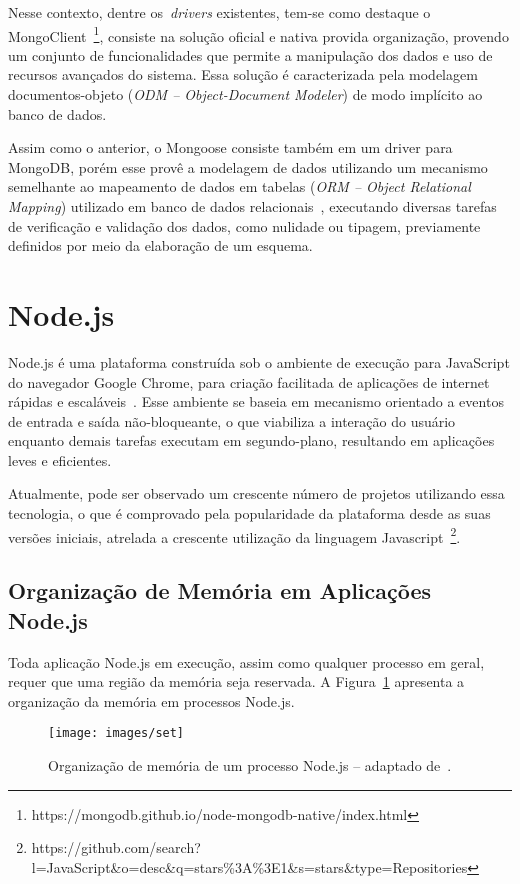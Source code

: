 \documentclass[12pt]{article}
\begin{document}
Nesse contexto, dentre os~\emph{drivers} existentes, tem-se como destaque o MongoClient~\footnote{https://mongodb.github.io/node-mongodb-native/index.html}, consiste na solução oficial e nativa provida organização, provendo um conjunto de funcionalidades que permite a manipulação dos dados e uso de recursos avançados do sistema. 
Essa solução é caracterizada pela modelagem documentos-objeto (\emph{ODM -- Object-Document Modeler}) de modo implícito ao banco de dados.

Assim como o anterior, o Mongoose consiste também em um driver para MongoDB, porém esse provê a modelagem de dados utilizando um mecanismo semelhante ao mapeamento de dados em tabelas (\emph{ORM -- Object Relational Mapping}) utilizado em banco de dados relacionais~\cite{mardan2014boosting}, executando diversas tarefas de verificação e validação dos dados, como nulidade ou tipagem, previamente definidos por meio da elaboração de um esquema.

\section{Node.js}
\label{section:nodejs}

Node.js é uma plataforma construída sob o ambiente de execução para JavaScript do navegador Google Chrome, para criação facilitada de aplicações de internet rápidas e escaláveis~\cite{nodejs}. 
Esse ambiente se baseia em mecanismo orientado a eventos de entrada e saída não-bloqueante, o que viabiliza a interação do usuário enquanto demais tarefas executam em segundo-plano, resultando em aplicações leves e eficientes.

Atualmente, pode ser observado um crescente número de projetos utilizando essa tecnologia, o que é comprovado pela popularidade da plataforma desde as suas versões iniciais, atrelada a crescente utilização da linguagem Javascript~\footnote{https://github.com/search?l=JavaScript\&o=desc\&q=stars\%3A\%3E1\&s=stars\&type=Repositories}.

\subsection{Organização de Memória em Aplicações Node.js}

Toda aplicação Node.js em execução, assim como qualquer processo em geral, requer que uma região da memória seja reservada. 
A Figura~\ref{figure:memoria} apresenta a organização da memória em processos Node.js.

\begin{figure}[h]
    \centering
    \texttt{[image: images/set]}
    \caption{Organização de memória de um processo Node.js -- adaptado de~\cite{nodememory}.}
    \label{figure:memoria}
\end{figure}
\end{document}
